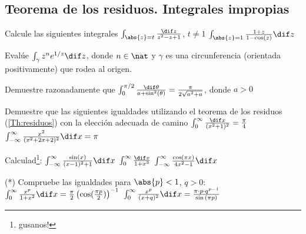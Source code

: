 \subsection{Teorema de los residuos. Integrales impropias}
\begin{problem}
Calcule las siguientes integrales
\ppart $\int_{\abs{z}=t} \frac{\dif z}{z^2 - z + 1}$, $t \neq 1$
\ppart $\int_{\abs{z}=1} \frac{1 + z}{1 - \cos(z)} \dif z$
\solution

\end{problem}

\begin{problem}
Evalúe $\int_{\gamma} z^n e^{1/z} \dif z$, donde $n \in \nat$ y $\gamma$ es una circunferencia (orientada positivamente) que rodea al origen.
\solution

\end{problem}

\begin{problem}
Demuestre razonadamente que $\int_{0}^{\pi / 2} \frac{\dif \theta}{a + \sin^2(\theta)} = \frac{\pi}{2 \sqrt{a^2 + a}}$, donde $a > 0$
\solution

\end{problem}

\begin{problem}
Demuestre que las siguientes igualdades utilizando el teorema de los residuos (\ref{Th:residuos}) con la elección adecuada de camino
\ppart $\int_{0}^{\infty} \frac{\dif x}{(x^2 + 1)^2} = \frac{\pi}{4}$
\ppart $\int_{-\infty}^{\infty} \frac{x^2}{(x^2 + 2x + 2)^2} \dif x = \pi$
\solution

\end{problem}

\begin{problem}
Calculad\footnote{gusanos!}:
\ppart $\int_{-\infty}^{\infty} \frac{\sin(x)}{(x - 1)^2 +1} \dif x$
\ppart $\int_{0}^{\infty} \frac{\dif x}{1 + x^3}$
\ppart $\int_{-\infty}^{\infty} \frac{\cos(\pi x)}{4x^2 - 1} \dif x$
\solution

\end{problem}

\begin{problem}
(*) Compruebe las igualdades para $\abs{p} < 1$, $q > 0$:
\ppart $\int_{0}^{\infty} \frac{x^p}{1 + x^2} \dif x = \frac{\pi}{2} \left( \cos(\frac{\pi p}{2}) \right)^{-1} $
\ppart $\int_{0}^{\infty} \frac{x^p}{(x + q)^2} \dif x = \frac{\pi \cdot p \cdot q^{p-1}}{\sin{(\pi p)}}$
\solution

\end{problem}

